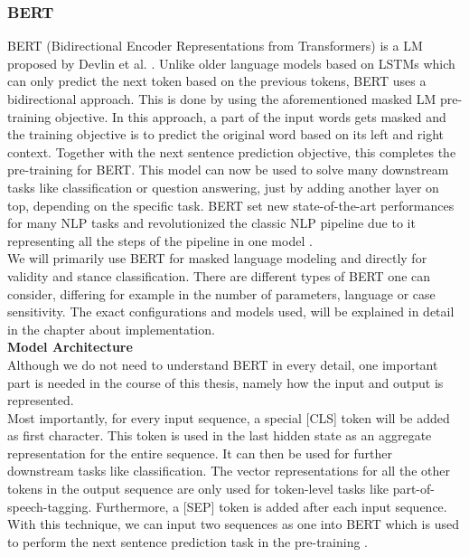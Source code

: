 \subsubsection{BERT}
BERT (Bidirectional Encoder Representations from Transformers) is a LM proposed by Devlin et al. \cite{bert}. Unlike older language models based on LSTMs which can only predict the next token based on the previous tokens, BERT uses a bidirectional approach. This is done by using the aforementioned masked LM pre-training objective. In this approach, a part of the input words gets masked and the training objective is to predict the original word based on its left and right context. Together with the next sentence prediction objective, this completes the pre-training for BERT. This model can now be used to solve many downstream tasks like classification or question answering, just by adding another layer on top, depending on the specific task. BERT set new state-of-the-art performances for many NLP tasks and revolutionized the classic NLP pipeline due to it representing all the steps of the pipeline in one model \cite{bertexplain}.  \\
We will primarily use BERT for masked language modeling and directly for validity and stance classification. There are different types of BERT one can consider, differing for example in the number of parameters, language or case sensitivity. The exact configurations and models used, will be explained in detail in the chapter about implementation. \\

\textbf{Model Architecture} \\
Although we do not need to understand BERT in every detail, one important part is needed in the course of this thesis, namely how the input and output is represented. \\
Most importantly, for every input sequence, a special [CLS] token will be added as first character. This token is used in the last hidden state as an aggregate representation for the entire sequence. It can then be used for further downstream tasks like classification. The vector representations for all the other tokens in the output sequence are only used for token-level tasks like part-of-speech-tagging. Furthermore, a [SEP] token is added after each input sequence. With this technique, we can input two sequences as one into BERT which is used to perform the next sentence prediction task in the pre-training \cite{bert}.


